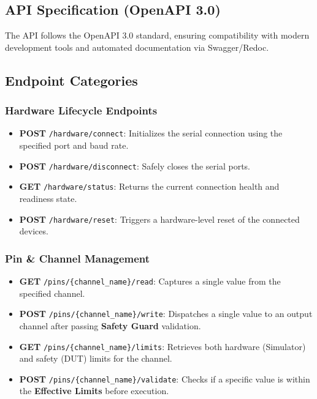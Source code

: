 \documentclass[conference]{IEEEtran}
\begin{document}
\subsection{API Specification (OpenAPI 3.0)}
The API follows the OpenAPI 3.0 standard, ensuring compatibility with modern development tools and automated documentation via Swagger/Redoc.

\subsection{Endpoint Categories}
\subsubsection{Hardware Lifecycle Endpoints}
\begin{itemize}
    \item \textbf{POST} \texttt{/hardware/connect}: Initializes the serial connection using the specified port and baud rate.
    \item \textbf{POST} \texttt{/hardware/disconnect}: Safely closes the serial ports.
    \item \textbf{GET} \texttt{/hardware/status}: Returns the current connection health and readiness state.
    \item \textbf{POST} \texttt{/hardware/reset}: Triggers a hardware-level reset of the connected devices.
\end{itemize}

\subsubsection{Pin \& Channel Management}
\begin{itemize}
    \item \textbf{GET} \texttt{/pins/\{channel\_name\}/read}: Captures a single value from the specified channel.
    \item \textbf{POST} \texttt{/pins/\{channel\_name\}/write}: Dispatches a single value to an output channel after passing \textbf{Safety Guard} validation.
    \item \textbf{GET} \texttt{/pins/\{channel\_name\}/limits}: Retrieves both hardware (Simulator) and safety (DUT) limits for the channel.
    \item \textbf{POST} \texttt{/pins/\{channel\_name\}/validate}: Checks if a specific value is within the \textbf{Effective Limits} before execution.
\end{itemize}
\end{document}
